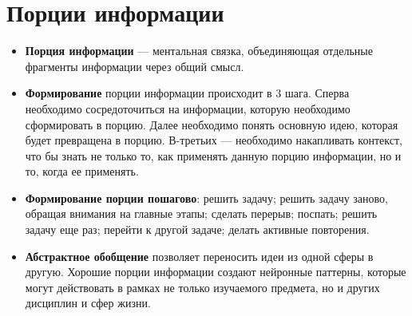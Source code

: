 \documentclass{article}
\begin{document}
\section{Порции информации}
\begin{itemize}
\item \textbf{Порция информации} --- ментальная связка, объединяющая отдельные фрагменты информации через общий смысл.
\item \textbf{Формирование} порции информации происходит в 3 шага. Сперва необходимо сосредоточиться на информации, которую необходимо сформировать в порцию. Далее необходимо понять основную идею, которая будет превращена в порцию. В-третьих --- необходимо накапливать контекст, что бы знать не только то, как применять данную порцию информации, но и то, когда ее применять.
\item \textbf{Формирование порции пошагово}: решить задачу; решить задачу заново, обращая внимания на главные этапы; сделать перерыв; поспать; решить задачу еще раз; перейти к другой задаче; делать активные повторения.
\item \textbf{Абстрактное обобщение} позволяет переносить идеи из одной сферы в другую. Хорошие порции информации создают нейронные паттерны, которые могут действовать в рамках не только изучаемого предмета, но и других дисциплин и сфер жизни.
\end{itemize}
\end{document}
